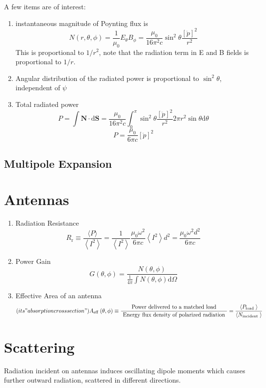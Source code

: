 \documentclass[12pt,a4paper]{article}
\begin{document}
A few items are of interest:
\begin{enumerate}
    \item instantaneous magnitude of Poynting flux is
    $$
    N(r, \theta, \phi)=\frac{1}{\mu_0} E_\theta B_\phi=\frac{\mu_0}{16 \pi^2 c} \sin ^2 \theta \frac{[\ddot{p}]^2}{r^2}
    $$
    This is proportional to $1/r^2$, note that the radiation term in E and B fields is proportional to $1/r$.
    \item Angular distribution of the radiated power is proportional to $\sin^2\theta$, independent of $\psi$
    \item Total radiated power
    $$
    P=\int \boldsymbol{N} \cdot \mathrm{d} \boldsymbol{S}=\frac{\mu_0}{16 \pi^2 c} \int_0^\pi \sin ^2 \theta \frac{[\ddot{p}]^2}{r^2} 2 \pi r^2 \sin \theta \mathrm{d} \theta
    $$
    $$
    P=\frac{\mu_0}{6 \pi c}[\ddot{p}]^2
    $$
\end{enumerate}
\subsection{Multipole Expansion}

\section{Antennas}
\begin{enumerate}
    \item Radiation Resistance $$ 
    R_{\mathrm{r}} \equiv \frac{\langle P\rangle}{\left\langle I^2\right\rangle}=\frac{1}{\left\langle I^2\right\rangle} \frac{\mu_0 \omega^2}{6 \pi c}\left\langle I^2\right\rangle d^2 = \frac{\mu_0 \omega^2 d^2}{6 \pi c}
    $$
    \item Power Gain  $$ 
    G(\theta, \phi)=\frac{N(\theta, \phi)}{\frac{1}{4 \pi} \int N(\theta, \phi) \mathrm{d} \Omega}
    $$
    \item Effective Area of an antenna
    $$ \text(its "absorption cross section")
    A_{\text {eff }}(\theta, \phi) \equiv \frac{\text { Power delivered to a matched load }}{\text { Energy flux density of polarized radiation }}=\frac{\left\langle P_{\text {load }}\right\rangle}{\left\langle N_{\text {incident }}\right\rangle}
    $$
\end{enumerate}

\section{Scattering}
Radiation incident on antennas induces oscillating dipole moments which causes further outward radiation, scattered in different directions.
\end{document}
